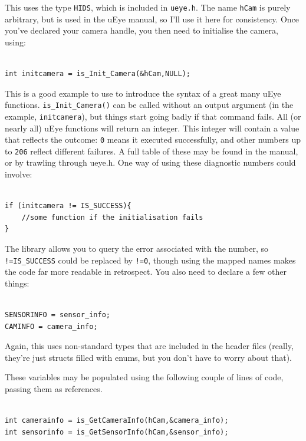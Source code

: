 \documentclass[12pt,a4paper]{article}
\begin{document}
This uses the type \texttt{HIDS}, which is included in \texttt{ueye.h}. The name \texttt{hCam} is purely arbitrary, but is used in the uEye manual, so I'll use it here for consistency. Once you've declared your camera handle, you then need to initialise the camera, using:

\lstset{language=C++}
\begin{lstlisting}

int initcamera = is_Init_Camera(&hCam,NULL);

\end{lstlisting}

This is a good example to use to introduce the syntax of a great many uEye functions. \texttt{is\_Init\_Camera()} can be called without an output argument (in the example, \texttt{initcamera}), but things start going badly if that command fails. All (or nearly all) uEye functions will return an integer. This integer will contain a value that reflects the outcome: \texttt{0} means it executed successfully, and other numbers up to \texttt{206} reflect different failures. A full table of these may be found in the manual, or by trawling through ueye.h. One way of using these diagnostic numbers could involve:

\lstset{language=C++}
\begin{lstlisting}

if (initcamera != IS_SUCCESS){
	//some function if the initialisation fails
}

\end{lstlisting}

The library allows you to query the error associated with the number, so \texttt{!=IS\_SUCCESS} could be replaced by \texttt{!=0}, though using the mapped names makes the code far more readable in retrospect. You also need to declare a few other things:

\lstset{language=C++}
\begin{lstlisting}

SENSORINFO = sensor_info;
CAMINFO = camera_info;

\end{lstlisting}

Again, this uses non-standard types that are included in the header files (really, they're just structs filled with enums, but you don't have to worry about that).

These variables may be populated using the following couple of lines of code, passing them as references.

\lstset{language=C++}
\begin{lstlisting}

int camerainfo = is_GetCameraInfo(hCam,&camera_info);
int sensorinfo = is_GetSensorInfo(hCam,&sensor_info);

\end{lstlisting}
\end{document}
